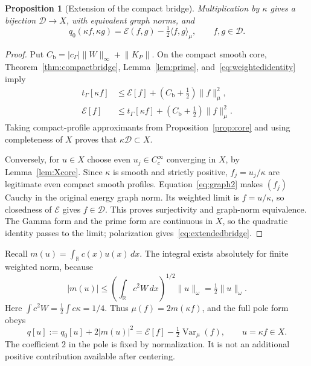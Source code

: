 \documentclass[11pt,a4paper]{article}
\numberwithin{equation}{section}
\newtheorem{proposition}[theorem]{Proposition}
\theoremstyle{remark}
\newcommand{\R}{\mathbb R}
\newcommand{\E}{\mathcal E}
\newcommand{\D}{\mathcal D}
\newcommand{\tg}{t_{\Gamma}}
\newcommand{\cg}{c_{\Gamma}}
\newcommand{\Var}{\operatorname{Var}}
\newcommand{\ip}[2]{\langle #1,#2\rangle}
\newcommand{\norm}[1]{\lVert #1\rVert}
\begin{document}
\begin{proposition}[Extension of the compact bridge]\label{prop:domain}
Multiplication by $\kappa$ gives a bijection $\D\to X$, with equivalent graph norms, and
\begin{equation}\label{eq:extendedbridge}
 q_0(\kappa f,\kappa g)=\E(f,g)-\tfrac12\ip{f}{g}_\mu,
 \qquad f,g\in\D.
\end{equation}
\end{proposition}
\begin{proof}
Put $C_{\mathrm b}=|\cg|\norm{W}_\infty+\norm{K_P}$. On the compact smooth core, Theorem~\ref{thm:compactbridge}, Lemma~\ref{lem:prime}, and~\eqref{eq:weightedidentity} imply
\begin{align}
 \tg[\kappa f]&\le\E[f]+(C_{\mathrm b}+\tfrac12)\norm{f}_\mu^2,\label{eq:graph1}\\
 \E[f]&\le\tg[\kappa f]+(C_{\mathrm b}+\tfrac12)\norm{f}_\mu^2.\label{eq:graph2}
\end{align}
Taking compact-profile approximants from Proposition~\ref{prop:core} and using completeness of $X$ proves that $\kappa\D\subset X$.

Conversely, for $u\in X$ choose even $u_j\in C_c^\infty$ converging in $X$, by Lemma~\ref{lem:Xcore}. Since $\kappa$ is smooth and strictly positive, $f_j=u_j/\kappa$ are legitimate even compact smooth profiles. Equation~\eqref{eq:graph2} makes $(f_j)$ Cauchy in the original energy graph norm. Its weighted limit is $f=u/\kappa$, so closedness of $\E$ gives $f\in\D$. This proves surjectivity and graph-norm equivalence. The Gamma form and the prime form are continuous in $X$, so the quadratic identity passes to the limit; polarization gives~\eqref{eq:extendedbridge}.
\end{proof}

Recall $m(u)=\int_\R c(x)u(x)\,dx$. The integral exists absolutely for finite weighted norm, because
\begin{equation}\label{eq:meanbound}
 |m(u)|\le\left(\int_\R c^2W\,dx\right)^{1/2}\norm{u}_\omega
       =\tfrac12\norm{u}_\omega.
\end{equation}
Here $\int c^2W=\tfrac12\int c\kappa=1/4$. Thus $\mu(f)=2m(\kappa f)$, and the full pole form obeys
\begin{equation}\label{eq:polebridge}
 q[u]:=q_0[u]+2|m(u)|^2
       =\E[f]-\tfrac12\Var_\mu(f),\qquad u=\kappa f\in X.
\end{equation}
The coefficient $2$ in the pole is fixed by normalization. It is not an additional positive contribution available after centering.
\end{document}
